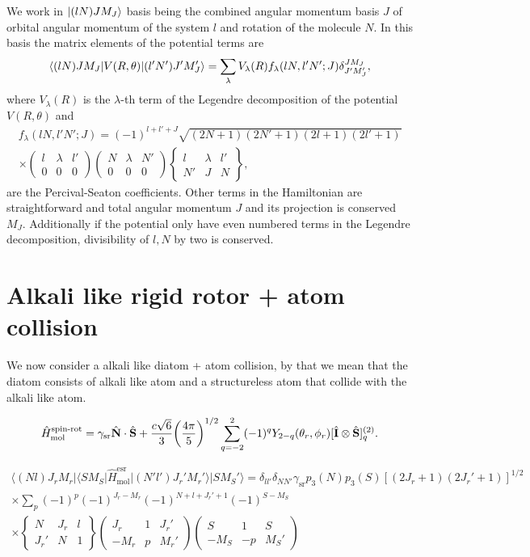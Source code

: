 \documentclass[a4paper]{article}
\newcommand{\threejm}[6]{ \left(\begin{array}{ccc} #1 & #3 & #5\\
    #2 & #4 & #6
\end{array}
\right)}
\newcommand{\sixj}[6]{ \left\{\begin{array}{ccc} #1 & #3 & #5\\
    #2 & #4 & #6
\end{array}
\right\}}
\begin{document}
    We work in \(\ket{(lN)J M_J}\) basis being the combined angular momentum basis \(J\) of orbital angular momentum of the system
    \(l\) and rotation of the molecule \(N\).
    In this basis the matrix elements of the potential terms are
    \[
        \braket{(lN)J M_J |V(R, \theta)| (l'N')J' M'_J} = \sum_\lambda V_\lambda(R) f_\lambda(lN, l'N'; J) \delta^{JM_J}_{J'M'_J},
    \]
    where $V_\lambda(R)$ is the $\lambda$-th term of the Legendre decomposition of the potential $V(R, \theta)$
    and
    \begin{multline}
        f_\lambda(lN, l'N'; J) = (-1)^{l + l' + J} \sqrt{(2N + 1)(2N' + 1)(2l + 1)(2l' + 1)} \\
            \times \threejm{l}{0}{\lambda}{0}{l'}{0} \threejm{N}{0}{\lambda}{0}{N'}{0} \sixj{l}{N'}{\lambda}{J}{l'}{N},
    \end{multline}
    are the Percival-Seaton coefficients.
    Other terms in the Hamiltonian are straightforward and total angular momentum \(J\) 
    and its projection is conserved \(M_J\).
    Additionally if the potential only have even numbered terms in the Legendre decomposition,
    divisibility of \(l, N\) by two is conserved.

\section{Alkali like rigid rotor + atom collision}
    We now consider a alkali like diatom + atom collision, by that we mean
    that the diatom consists of alkali like atom and a structureless atom that collide with the alkali like atom.


\begin{equation}{\label{Hmol_spin_rot}}
    \hat{H}_\text{mol}^\text{spin-rot} =  \gamma_\text{sr} \hat{\mathbf{N}}\cdot \hat{\mathbf{S}} + \frac{c\sqrt{6}}{3}\biggl{(}\frac{4\pi}{5}\biggr{)}^{1/2}
    \sum_{q=-2}^2 (-1)^qY_{2-q}(\theta_r,\phi_r) [\hat{\mathbf{I}}\otimes \hat{\mathbf{S}}]^{(2)}_q.
\end{equation}

\begin{multline}\label{mel_Hmol_term3sr}
    \langle (Nl)J_rM_r | \langle S M_S | \hat{H}_\text{mol}^\text{esr} | (N'l')J_r'M_r' \rangle | SM_S'\rangle 
     = \delta_{ll'}\delta_{NN'} \gamma_\text{sr} p_3(N)p_3(S) [(2J_r+1)(2J_r'+1)]^{1/2}
    \\ \times \sum_p (-1)^{p} (-1)^{J_r-M_r}(-1)^{N+l+J_r'+1} (-1)^{S-M_S} 
    \\ \times \sixj{N}{J_r'}{J_r}{N}{l}{1} \threejm{J_r}{-M_r}{1}{p}{J_r'}{M_r'} \threejm{S}{-M_S}{1}{-p}{S}{M_S'} 
\end{multline}
\end{document}
